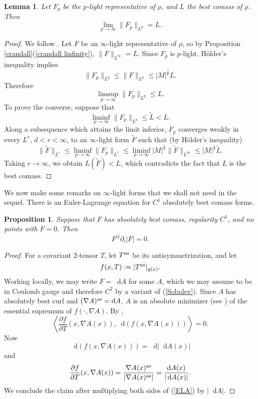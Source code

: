 \documentclass[reqno,11pt]{amsart}
\newcommand*\dif{\mathop{}\!\mathrm{d}}
\newtheorem{lemma}[theorem]{Lemma}
\newtheorem{proposition}[theorem]{Proposition}
\theoremstyle{definition}
\numberwithin{equation}{section}
\begin{document}
\begin{lemma}\label{p lights approximate L}
Let $F_p$ be the $p$-light representative of $\rho$, and $L$ the best comass of $\rho$. Then 
$$\lim_{p \to \infty} \|F_p\|_{L^p} = L.$$
\end{lemma}
\begin{proof}
We follow \cite[Lemma 2.7]{daskalopoulos2020transverse}.
Let $F$ be an $\infty$-light representative of $\rho$, so by Proposition \ref{crandall}(\ref{crandall linfinity}), $\|F\|_{L^\infty} = L$.
Since $F_p$ is $p$-light, H\"older's inequality implies 
$$\|F_p\|_{L^p} \leq \|F\|_{L^p} \leq |M|^{\frac{1}{p}} L.$$
Therefore 
$$\limsup_{p \to \infty} \|F_p\|_{L^p} \leq L.$$
To prove the converse, suppose that 
$$\liminf_{p \to \infty} \|F_p\|_{L^p} \leq \tilde L < L.$$
Along a subsequence which attains the limit inferior, $F_p$ converges weakly in every $L^r$, $d < r < \infty$, to an $\infty$-light form $\tilde F$ such that (by H\"older's inequality)
$$\|\tilde F\|_{L^r} \leq \liminf_{p \to \infty} \|F_p\|_{L^r} \leq \liminf_{p \to \infty} |M|^{\frac{1}{r}} \|\tilde F\|_{L^\infty} \leq |M|^{\frac{1}{r}} \tilde L.$$
Taking $r \to \infty$, we obtain $L(\tilde F) < L$, which contradicts the fact that $L$ is the best comass.
\end{proof}

We now make some remarks on $\infty$-light forms that we shall not need in the sequel.
There is an Euler-Lagrange equation for $C^1$ absolutely best comass forms.

\begin{proposition}
Suppose that $F$ has absolutely best comass, regularity $C^1$, and no points with $F = 0$. Then
\begin{equation}\label{infinityMaxwell}
	F^{ij} \partial_i |F| = 0.
\end{equation}
\end{proposition}
\begin{proof}
For a covariant $2$-tensor $T$, let $T^{\rm as}$ be its antisymmetrization, and let
$$f(x, T) := |T^{\rm as}|_{g(x)}.$$
Working locally, we may write $F = \dif A$ for some $A$, which we may assume to be in Coulomb gauge and therefore $C^2$ by a variant of (\ref{Sobolev}).
Since $A$ has absolutely best curl and $(\nabla A)^{\rm as} = \dif A$, $A$ is an absolute minimizer (see \cite[Definition 5.1]{Barron2001}) of the essential supremum of $f(\cdot, \nabla A)$.
By \cite[Theorem 5.2]{Barron2001},
\begin{equation}\label{ELA}
	\left\langle \frac{\partial f}{\partial T}(x, \nabla A(x)), \dif (f(x, \nabla A(x))) \right\rangle = 0.
\end{equation}
Now
$$\dif(f(x, \nabla A(x))) = \dif |\dif A(x)|$$
and 
$$\frac{\partial f}{\partial T}(x, \nabla A(x)) = \frac{\nabla A(x)^{\rm as}}{|\nabla A(x)^{\rm as}|} = \frac{\dif A(x)}{|\dif A(x)|}.$$
We conclude the claim after multiplying both sides of (\ref{ELA}) by $|\dif A|$.
\end{proof}
\end{document}
